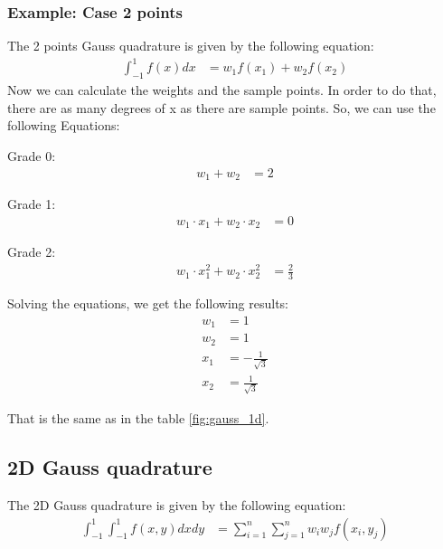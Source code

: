 \documentclass{article}  %
\begin{document}
\subsubsection{Example: Case 2 points}
The 2 points Gauss quadrature is given by the following equation:
\begin{align}
  \int_{-1}^{1} f(x) dx & = w_1 f(x_1) + w_2 f(x_2) 
\end{align}
Now we can calculate the weights and the sample points. In order to do that, there are as many degrees of x as there are sample points. So, we can use the following Equations:

Grade 0:
\begin{align}
  w_1 +w_2 &= 2 
\end{align}

Grade 1:
\begin{align}
  w_1 \cdot x_1 + w_2 \cdot x_2 &= 0 
\end{align}

Grade 2:
\begin{align}
  w_1 \cdot x_1^2 + w_2 \cdot x_2^2 &= \frac{2}{3} 
\end{align}

Solving the equations, we get the following results:  
\begin{align}
  w_1 &= 1 \\
  w_2 &= 1 \\
  x_1 &= -\frac{1}{\sqrt{3}} \\
  x_2 &= \frac{1}{\sqrt{3}}
\end{align}

That is the same as in the table \ref{fig:gauss_1d}.
\subsection{2D Gauss quadrature}
The 2D Gauss quadrature is given by the following equation:
\begin{align}
  \int_{-1}^{1}\int_{-1}^{1} f(x,y) dx dy & = \sum_{i=1}^{n} \sum_{j=1}^{n} w_i w_j f(x_i,y_j) \\
\end{align}
\end{document}
